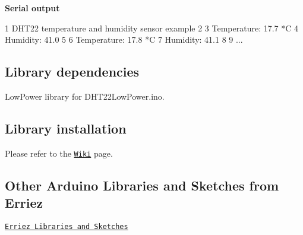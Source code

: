 {\bfseries Serial output}


\begin{DoxyCode}
1 DHT22 temperature and humidity sensor example
2 
3 Temperature: 17.7 *C
4 Humidity: 41.0 %
5 
6 Temperature: 17.8 *C
7 Humidity: 41.1 %
8 
9 ...
\end{DoxyCode}


\subsection*{Library dependencies}


\begin{DoxyItemize}
\item {\ttfamily Low\+Power} library for {\ttfamily D\+H\+T22\+Low\+Power.\+ino}.
\end{DoxyItemize}

\subsection*{Library installation}

Please refer to the \href{https://github.com/Erriez/ErriezArduinoLibrariesAndSketches/wiki}{\tt Wiki} page.

\subsection*{Other Arduino Libraries and Sketches from Erriez}


\begin{DoxyItemize}
\item \href{https://github.com/Erriez/ErriezArduinoLibrariesAndSketches}{\tt Erriez Libraries and Sketches} 
\end{DoxyItemize}